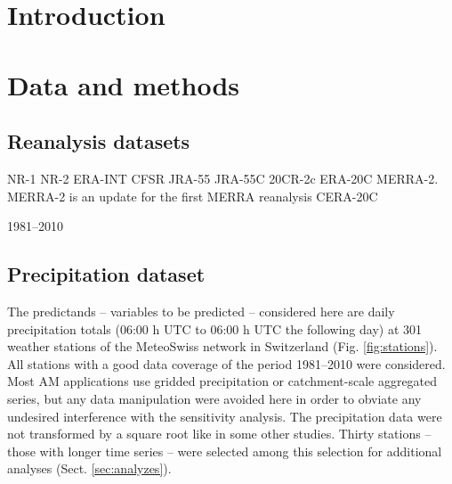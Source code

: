 \documentclass{ametsoc}
\begin{document}



\section{Introduction}

\section{Data and methods}
\label{sec:data}

\subsection{Reanalysis datasets}



NR-1 \citep{Kalnay1996, Kistler2001}
NR-2 \citep{Kanamitsu2002}
ERA-INT \citep{Dee2011a}
CFSR \citep{Saha2010a}
JRA-55 \citep{Kobayashi2015, Harada2016}
JRA-55C
20CR-2c \citep{Compo2011}
ERA-20C \citep{Poli2016}
MERRA-2. MERRA-2 is an update for the first MERRA reanalysis \citep{Rienecker2011}
CERA-20C


1981--2010






\subsection{Precipitation dataset}
\label{sec:precip}

The predictands -- variables to be predicted -- considered here are daily precipitation totals (06:00 h UTC to 06:00 h UTC the following day) at 301 weather stations of the MeteoSwiss network in Switzerland (Fig. \ref{fig:stations}). All stations with a good data coverage of the period 1981--2010 were considered. Most AM applications use gridded precipitation or catchment-scale aggregated series, but any data manipulation were avoided here in order to obviate any undesired interference with the sensitivity analysis. The precipitation data were not transformed by a square root like in some other studies. Thirty stations -- those with longer time series -- were selected among this selection for additional analyses (Sect. \ref{sec:analyzes}).
\end{document}
